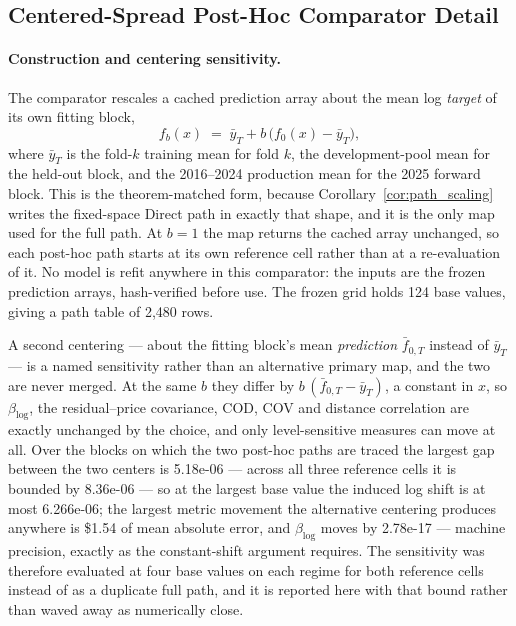 \documentclass[10pt]{article}
\theoremstyle{definition}
\newcommand{\1}{\mathbf{1}}
\begin{document}
\subsection{Centered-Spread Post-Hoc Comparator Detail}
\label{app:centered_spread_detail}

\paragraph{Construction and centering sensitivity.}
The comparator rescales a cached prediction array about the mean log \emph{target} of
its own fitting block,
\[
  f_b(x) \;=\; \bar y_T + b\,\bigl(f_0(x)-\bar y_T\bigr),
\]
where $\bar y_T$ is the fold-$k$ training mean for fold $k$, the development-pool mean for the
held-out block, and the 2016--2024 production mean for the 2025 forward block. This is the
theorem-matched form, because Corollary~\ref{cor:path_scaling} writes the fixed-space Direct path in
exactly that shape, and it is the only map used for the full path. At $b=1$ the map returns the
cached array unchanged, so each post-hoc path starts at its own reference cell rather than at a
re-evaluation of it. No model is refit anywhere in this comparator: the inputs are the frozen
prediction arrays, hash-verified before use. The frozen grid holds 124 base values, giving a
path table of 2,480 rows.

A second centering --- about the fitting block's mean \emph{prediction}
$\bar f_{0,T}$ instead of $\bar y_T$ --- is a named sensitivity rather than an alternative primary
map, and the two are never merged. At the same $b$ they differ by $b\,(\bar f_{0,T}-\bar y_T)$, a
constant in $x$, so $\beta_{\log}$, the residual--price covariance, COD, COV and distance
correlation are exactly unchanged by the choice, and only level-sensitive measures can move at all.
Over the blocks on which the two post-hoc paths are traced the largest gap between the two centers
is 5.18e-06 --- across all three reference cells it is bounded by 8.36e-06 --- so at the largest
base value the induced log shift is at most 6.266e-06; the largest metric movement the alternative
centering produces anywhere is \$1.54{} of mean absolute error, and $\beta_{\log}$ moves
by 2.78e-17 --- machine precision, exactly as the constant-shift argument requires. The
sensitivity was therefore evaluated at four base values on each regime for both reference cells
instead of as a duplicate full path, and it is reported here with that bound rather than waved away
as numerically close.
\end{document}
